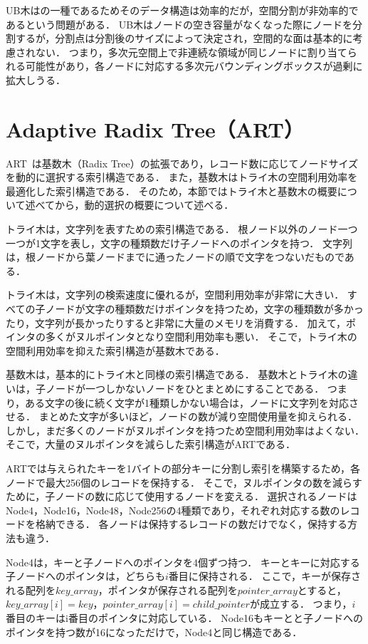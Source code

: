 UB木は\BTree{}の一種であるためそのデータ構造は効率的だが，空間分割が非効率的であるという問題がある．
UB木はノードの空き容量がなくなった際にノードを分割するが，分割点は分割後のサイズによって決定され，空間的な面は基本的に考慮されない．
つまり，多次元空間上で非連続な領域が同じノードに割り当てられる可能性があり，各ノードに対応する多次元バウンディングボックスが過剰に拡大しうる．

\section{Adaptive Radix Tree（ART）}

ART~\cite{icde:Leis2013}は基数木（Radix Tree）の拡張であり，レコード数に応じてノードサイズを動的に選択する索引構造である．
また，基数木はトライ木の空間利用効率を最適化した索引構造である．
そのため，本節ではトライ木と基数木の概要について述べてから，動的選択の概要について述べる．

トライ木は，文字列を表すための索引構造である．
根ノード以外のノード一つ一つが1文字を表し，文字の種類数だけ子ノードへのポインタを持つ．
文字列は，根ノードから葉ノードまでに通ったノードの順で文字をつないだものである．

トライ木は，文字列の検索速度に優れるが，空間利用効率が非常に大きい．
すべての子ノードが文字の種類数だけポインタを持つため，文字の種類数が多かったり，文字列が長かったりすると非常に大量のメモリを消費する．
加えて，ポインタの多くがヌルポインタとなり空間利用効率も悪い．
そこで，トライ木の空間利用効率を抑えた索引構造が基数木である．

基数木は，基本的にトライ木と同様の索引構造である．
基数木とトライ木の違いは，子ノードが一つしかないノードをひとまとめにすることである．
つまり，ある文字の後に続く文字が1種類しかない場合は，ノードに文字列を対応させる．
まとめた文字が多いほど，ノードの数が減り空間使用量を抑えられる．
しかし，まだ多くのノードがヌルポインタを持つため空間利用効率はよくない．
そこで，大量のヌルポインタを減らした索引構造がARTである．

ARTでは与えられたキーを1バイトの部分キーに分割し索引を構築するため，各ノードで最大256個のレコードを保持する．
そこで，ヌルポインタの数を減らすために，子ノードの数に応じて使用するノードを変える．
選択されるノードはNode4，Node16，Node48，Node256の4種類であり，それぞれ対応する数のレコードを格納できる．
各ノードは保持するレコードの数だけでなく，保持する方法も違う．

Node4は，キーと子ノードへのポインタを4個ずつ持つ．
キーとキーに対応する子ノードへのポインタは，どちらも$i$番目に保持される．
ここで，キーが保存される配列を$key\_array$，ポインタが保存される配列を$pointer\_array$とすると，$key\_array[i]=key$，$pointer\_array[i]=child\_pointer$が成立する．
つまり，$i$番目のキーはi番目のポインタに対応している．
Node16もキーとと子ノードへのポインタを持つ数が16になっただけで，Node4と同じ構造である．


